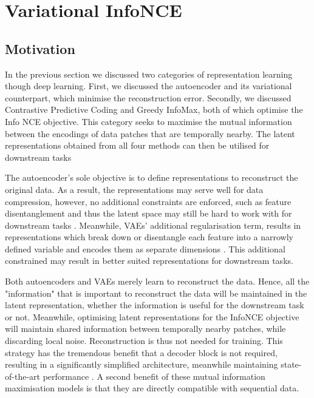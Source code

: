 \chapter{Variational InfoNCE}

\section{Motivation} %
	In the previous section we discussed two categories of representation learning though deep learning. First, we discussed the autoencoder and its variational counterpart, which minimise the reconstruction error. Secondly, we discussed Contrastive Predictive Coding and Greedy InfoMax, both of which optimise the Info NCE objective. This category seeks to maximise the mutual information between the encodings of data patches that are temporally nearby. The latent representations obtained from all four methods can then be utilised for downstream tasks \cite{bengioRepresentationLearningReview2013, weiRecentAdvancesVariational2021, oordRepresentationLearningContrastive2019, lowePuttingEndEndtoEnd2020}
	
		The autoencoder's sole objective is to define representations to reconstruct the original data. As a result, the representations may serve well for data compression, however, no additional constraints are enforced, such as feature disentanglement and thus the latent space may still be hard to work with for downstream tasks \cite{tschannenRecentAdvancesAutoencoderBased2018}. Meanwhile, VAEs' additional regularisation term, results in representations which break down or disentangle each feature into a narrowly defined variable and encodes them as separate dimensions \cite{weiRecentAdvancesVariational2021}. This additional constrained may result in better suited representations for downstream tasks. %

		Both autoencoders and VAEs merely learn to reconstruct the data. Hence, all the "information" that is important to reconstruct the data will be maintained in the latent representation, whether the information is useful for the downstream task or not. Meanwhile, optimising latent representations for the InfoNCE objective will maintain shared information between temporally nearby patches, while discarding local noise. Reconstruction is thus not needed for training. This strategy has the tremendous benefit that a decoder block is not required, resulting in a significantly simplified architecture, meanwhile maintaining state-of-the-art performance \cite{stackeEvaluationContrastivePredictive2020}. A second benefit of these mutual information maximisation models is that they are directly compatible with sequential data.
		

